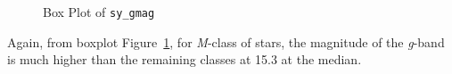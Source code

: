 \documentclass[
  letterpaper,
  DIV=11,
  numbers=noendperiod]{scrartcl}
\begin{document}
\begin{longtable}[]
\end{longtable}

\begin{figure}[H]


\caption{\label{fig-sy-gmag}Box Plot of \texttt{sy\_gmag}}

\end{figure}%

Again, from boxplot Figure~\ref{fig-sy-gmag}, for \emph{M}-class of
stars, the magnitude of the \emph{g}-band is much higher than the
remaining classes at 15.3 at the median.
\end{document}
